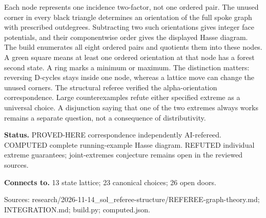 Each node represents one incidence two-factor, not one ordered pair. The unused corner in every black triangle determines an orientation of the full spoke graph with prescribed outdegrees. Subtracting two such orientations gives integer face potentials, and their componentwise order gives the displayed Hasse diagram. The build enumerates all eight ordered pairs and quotients them into these nodes. A green square means at least one ordered orientation at that node has a forest second state. A ring marks a minimum or maximum. The distinction matters: reversing D-cycles stays inside one node, whereas a lattice move can change the unused corners. The structural referee verified the alpha-orientation correspondence. Large counterexamples refute either specified extreme as a universal choice. A disjunction saying that one of the two extremes always works remains a separate question, not a consequence of distributivity.

\textbf{Status.} PROVED-HERE correspondence independently AI-refereed. COMPUTED complete running-example Hasse diagram. REFUTED individual extreme guarantees; joint-extremes conjecture remains open in the reviewed sources.

\textbf{Connects to.} 13 state lattice; 23 canonical choices; 26 open doors.

{\footnotesize\raggedright Sources: research/\allowbreak{}2026-11-14\_sol\_referee-structure/\allowbreak{}REFEREE-graph-theory.md;\allowbreak{} INTEGRATION.md;\allowbreak{} build.py;\allowbreak{} computed.json.\par}

